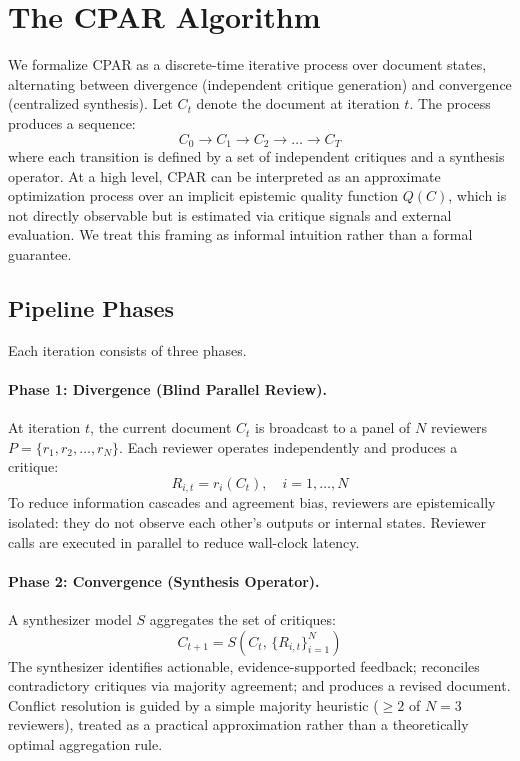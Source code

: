 \documentclass[11pt, a4paper]{article}
\begin{document}
\section{The CPAR Algorithm}
\label{sec:algorithm}

We formalize CPAR as a discrete-time iterative process over document states, alternating between divergence (independent critique generation) and convergence (centralized synthesis). Let $C_t$ denote the document at iteration $t$. The process produces a sequence:
\begin{equation}
C_0 \rightarrow C_1 \rightarrow C_2 \rightarrow \dots \rightarrow C_T
\end{equation}
where each transition is defined by a set of independent critiques and a synthesis operator. At a high level, CPAR can be interpreted as an approximate optimization process over an implicit epistemic quality function $Q(C)$, which is not directly observable but is estimated via critique signals and external evaluation. We treat this framing as informal intuition rather than a formal guarantee.

\subsection{Pipeline Phases}

Each iteration consists of three phases.

\paragraph{Phase 1: Divergence (Blind Parallel Review).}
At iteration $t$, the current document $C_t$ is broadcast to a panel of $N$ reviewers $P = \{r_1, r_2, \dots, r_N\}$. Each reviewer operates independently and produces a critique:
\begin{equation}
R_{i,t} = r_i(C_t), \quad i = 1, \dots, N
\end{equation}
To reduce information cascades and agreement bias, reviewers are epistemically isolated: they do not observe each other's outputs or internal states. Reviewer calls are executed in parallel to reduce wall-clock latency.

\paragraph{Phase 2: Convergence (Synthesis Operator).}
A synthesizer model $S$ aggregates the set of critiques:
\begin{equation}
C_{t+1} = S\!\left(C_t,\, \{R_{i,t}\}_{i=1}^N\right)
\end{equation}
The synthesizer identifies actionable, evidence-supported feedback; reconciles contradictory critiques via majority agreement; and produces a revised document. Conflict resolution is guided by a simple majority heuristic ($\geq 2$ of $N=3$ reviewers), treated as a practical approximation rather than a theoretically optimal aggregation rule.
\end{document}
